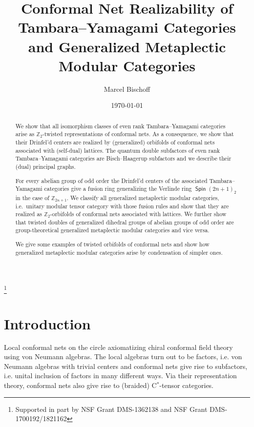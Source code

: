 \documentclass[twoside,11pt,reqno]{amsart}
\makeatletter
\theoremstyle{definition}
\theoremstyle{remark}
\newcommand{\Spin}{\mathop{\mathsf{Spin}}}
\newcommand{\ZZ}{\mathbb{Z}}
\DeclareRobustCommand{\ie}{i.e.\@\xspace}
\makeatother
\begin{document}
%
%
%
%
%
%
\date{\today}
\dateposted{\today}
\title[Realizability of TY Categories]{Conformal Net Realizability of 
  Tambara--Yamagami Categories
 and Generalized Metaplectic Modular Categories
}
\address{Department of Mathematics, Morton Hall 321, 1 Ohio University, Athens, OH 45701, USA}
\author{Marcel Bischoff}
\thanks{
  Supported in part by NSF Grant DMS-1362138 and NSF Grant DMS-1700192/1821162}
\begin{abstract}
We show that all isomorphism classes of even rank Tambara--Yamagami categories
arise as $\ZZ_2$-twisted representations of conformal nets.
As a consequence, we show that their Drinfel'd centers are realized 
by (generalized) orbifolds of conformal nets associated with (self-dual) lattices.
The quantum double subfactors of even rank Tambara--Yamagami 
categories are Bisch--Haagerup subfactors and
we describe their (dual) principal graphs.

For every abelian group of odd order the Drinfel'd centers of the associated Tambara--Yamagami categories give a fusion ring generalizing 
the Verlinde ring $\Spin(2n+1)_2$ in the case of $\ZZ_{2n+1}$.
We classify all generalized metaplectic modular categories, i.e.\ unitary modular tensor category with those fusion rules and show that they are realized as $\ZZ_2$-orbifolds of conformal nets associated with lattices.  
We further show that twisted doubles of generalized dihedral groups of abelian 
groups of odd order are group-theoretical generalized metaplectic modular categories and vice versa.

We give some examples of twisted orbifolds of conformal nets and 
show how generalized metaplectic modular categories arise
by condensation of simpler ones.


\end{abstract}

\maketitle
\tableofcontents


%
%
\section{Introduction}

Local conformal nets on the circle axiomatizing chiral conformal field theory
using von Neumann algebras. 
The local algebras turn out to be factors, \ie von Neumann algebras with 
trivial centers and conformal nets give rise to subfactors, 
\ie unital inclusion of factors in many different ways.
Via their representation theory, conformal nets also give rise to (braided) 
C$^{\ast}$-tensor categories.
\end{document}
